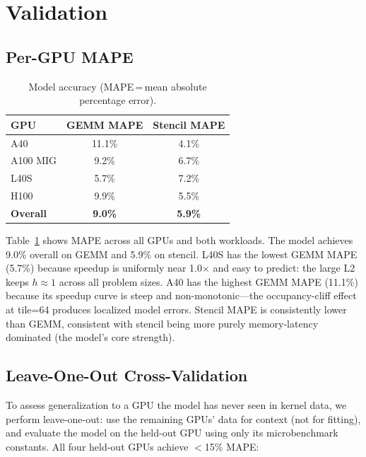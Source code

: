 \documentclass[sigplan,nonacm,10pt]{acmart}
\newcommand{\highlight}[1]{\colorbox{ummaize!35}{\textbf{#1}}}
\begin{document}
\section{Validation}
\label{sec:validation}

\subsection{Per-GPU MAPE}

\begin{table}[h]
\centering
\small
\caption{Model accuracy (MAPE\,=\,mean absolute percentage error).}
\label{tab:mape}
\renewcommand{\arraystretch}{1.2}
\begin{tabular}{@{}lcc@{}}
\toprule
\textbf{GPU} & \textbf{GEMM MAPE} & \textbf{Stencil MAPE} \\
\midrule
A40             & 11.1\% & 4.1\% \\
A100 MIG        &  9.2\% & 6.7\% \\
L40S            &  5.7\% & 7.2\% \\
H100            &  9.9\% & 5.5\% \\
\midrule
\rowcolor{ummaize!20}
\textbf{Overall} & \highlight{9.0\%} & \highlight{5.9\%} \\
\bottomrule
\end{tabular}
\end{table}

Table~\ref{tab:mape} shows MAPE across all GPUs and both workloads.
The model achieves 9.0\% overall on GEMM and 5.9\% on stencil.
L40S has the lowest GEMM MAPE (5.7\%) because speedup is uniformly
near 1.0$\times$ and easy to predict: the large L2 keeps $h \approx 1$
across all problem sizes.
A40 has the highest GEMM MAPE (11.1\%) because its speedup curve is
steep and non-monotonic---the occupancy-cliff effect at tile=64 produces
localized model errors.
Stencil MAPE is consistently lower than GEMM, consistent with stencil
being more purely memory-latency dominated (the model's core strength).

\subsection{Leave-One-Out Cross-Validation}

To assess generalization to a GPU the model has never seen in kernel
data, we perform leave-one-out: use the remaining GPUs' data for context
(not for fitting), and evaluate the model on the held-out GPU using only
its microbenchmark constants.
All four held-out GPUs achieve $<$15\% MAPE:
\end{document}
